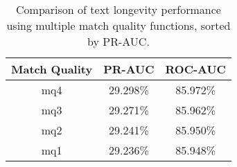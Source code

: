 \begin{table}[tbph]
\begin{center}
\begin{tabular}{|c||c|c|}
\hline
Match Quality & PR-AUC & ROC-AUC \\
\hline
\hline
mq4 & 29.298\% & 85.972\% \\
mq3 & 29.271\% & 85.962\% \\
mq2 & 29.241\% & 85.950\% \\
mq1 & 29.236\% & 85.948\% \\
\hline
\end{tabular}
\end{center}
\caption{Comparison of text longevity performance using
    multiple match quality functions, sorted by PR-AUC.}
\label{tab:textshoutA}
\end{table}
